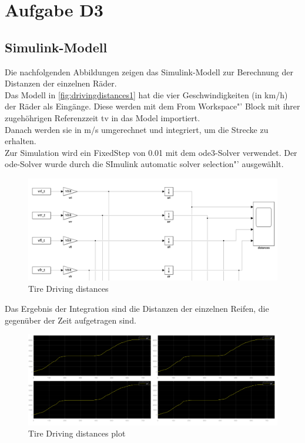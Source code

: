 
\chapter{Aufgabe D3}

\section{Simulink-Modell}
Die nachfolgenden Abbildungen zeigen das Simulink-Modell zur Berechnung der Distanzen der einzelnen Räder.\\
Das Modell in \autoref{fig:drivingdistances1} hat die vier Geschwindigkeiten (in km/h) der Räder als Eingänge. Diese werden mit dem \glqq From Workspace"' Block mit ihrer zugehöhrigen Referenzzeit tv in das Model importiert.\\
Danach werden sie in m/s umgerechnet und integriert, um die Strecke zu erhalten. \\
Zur Simulation wird ein FixedStep von 0.01 mit dem ode3-Solver verwendet. Der ode-Solver wurde durch die SImulink \glqq automatic solver selection"' ausgewählt.
\begin{figure}[h!]
	\centering
	\includegraphics[width=1\linewidth]{../Graphiken/DrivingDistances1}
	\caption{Tire Driving distances}
	\label{fig:drivingdistances1}
\end{figure}
Das Ergebnis der Integration sind die Distanzen der einzelnen Reifen, die gegenüber der Zeit aufgetragen sind.\newpage
\begin{figure}[h!]
	\centering
	\includegraphics[width=1\linewidth]{../Graphiken/DrivingDistances}
	\caption{Tire Driving distances plot}
	\label{fig:drivingdistances}
\end{figure}

